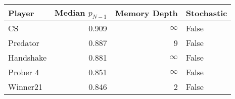 \begin{tabular}{lrrl}
\toprule
    Player &  Median $p_{N-1}$ &  Memory Depth & Stochastic \\
\midrule
        CS &             0.909 &            \(\infty\) &      False \\
  Predator &             0.887 &             9 &      False \\
 Handshake &             0.881 &            \(\infty\) &      False \\
  Prober 4 &             0.851 &            \(\infty\) &      False \\
  Winner21 &             0.846 &             2 &      False \\
\bottomrule
\end{tabular}
